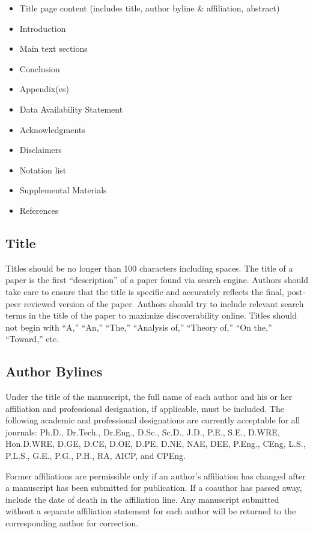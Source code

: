 \documentclass[
  NewProceedings,
  letterpaper]{./assets/ascelike-new}
\begin{document}
\begin{itemize}
\item
  Title page content (includes title, author byline \& affiliation,
  abstract)
\item
  Introduction
\item
  Main text sections
\item
  Conclusion
\item
  Appendix(es)
\item
  Data Availability Statement
\item
  Acknowledgments
\item
  Disclaimers
\item
  Notation list
\item
  Supplemental Materials
\item
  References
\end{itemize}

\hypertarget{title}{%
\subsection{Title}\label{title}}

Titles should be no longer than 100 characters including spaces. The
title of a paper is the first ``description'' of a paper found via
search engine. Authors should take care to ensure that the title is
specific and accurately reflects the final, post-peer reviewed version
of the paper. Authors should try to include relevant search terms in the
title of the paper to maximize discoverability online. Titles should not
begin with ``A,'' ``An,'' ``The,'' ``Analysis of,'' ``Theory of,'' ``On
the,'' ``Toward,'' etc.

\hypertarget{author-bylines}{%
\subsection{Author Bylines}\label{author-bylines}}

Under the title of the manuscript, the full name of each author and his
or her affiliation and professional designation, if applicable, must be
included. The following academic and professional designations are
currently acceptable for all journals: Ph.D., Dr.Tech., Dr.Eng., D.Sc.,
Sc.D., J.D., P.E., S.E., D.WRE, Hon.D.WRE, D.GE, D.CE, D.OE, D.PE, D.NE,
NAE, DEE, P.Eng., CEng, L.S., P.L.S., G.E., P.G., P.H., RA, AICP, and
CPEng.

Former affiliations are permissible only if an author's affiliation has
changed after a manuscript has been submitted for publication. If a
coauthor has passed away, include the date of death in the affiliation
line. Any manuscript submitted without a separate affiliation statement
for each author will be returned to the corresponding author for
correction.
\end{document}
